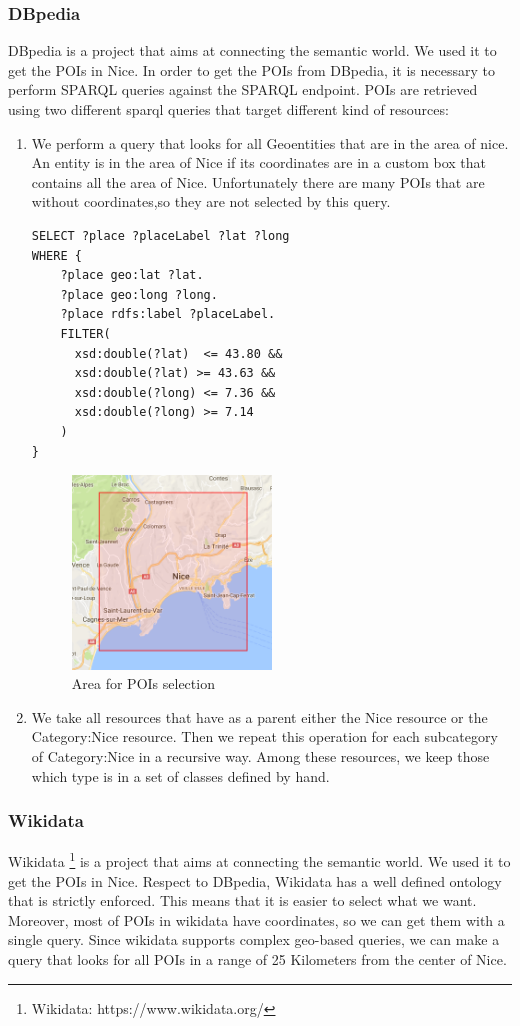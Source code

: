 \documentclass[paper=a4, fontsize=11pt]{scrartcl}
\begin{document}
\subsubsection{DBpedia}
DBpedia is a project that aims at connecting the semantic world. We used it to get the POIs in Nice.
In order to get the POIs from DBpedia, it is necessary to perform SPARQL queries against the SPARQL endpoint. POIs are retrieved using two different sparql queries that target different kind of resources:
\begin{enumerate}
\item We perform a query that looks for all Geoentities that are in the area of nice. An entity is in the area of Nice if its coordinates are in a custom box that contains all the area of Nice.
Unfortunately there are many POIs that are without coordinates,so they are not selected by this query.
\begin{lstlisting}
SELECT ?place ?placeLabel ?lat ?long
WHERE {
    ?place geo:lat ?lat.
    ?place geo:long ?long.
    ?place rdfs:label ?placeLabel.
    FILTER(
      xsd:double(?lat)  <= 43.80 &&
      xsd:double(?lat) >= 43.63 &&
      xsd:double(?long) <= 7.36 &&
      xsd:double(?long) >= 7.14
    )
}
\end{lstlisting}
\begin{figure}[!htb]
  \centering 
    \includegraphics[width=0.5\textwidth]{images/Nice.png}
    \caption{Area for POIs selection}
\end{figure}

\item We take all resources that have as a parent either the Nice resource or the Category:Nice resource. Then we repeat this operation for each subcategory of Category:Nice in a recursive way. Among these resources, we keep those which type is in a set of classes defined by hand.
\end{enumerate}
\subsubsection{Wikidata}
Wikidata \footnote{Wikidata: https://www.wikidata.org/} is a project that aims at connecting the semantic world. We used it to get the POIs in Nice. Respect to DBpedia, Wikidata has a well defined ontology that is strictly enforced. This means that it is easier to select what we want. Moreover, most of POIs in wikidata have coordinates, so we can get them with a single query. Since wikidata supports complex geo-based queries, we can make a query that looks for all POIs in a range of 25 Kilometers from the center of Nice.
\end{document}
